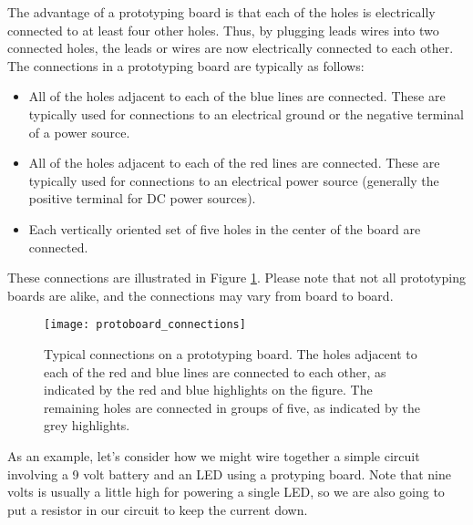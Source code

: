 The advantage of a prototyping board is that each of the holes is electrically 
connected to at least four other holes. Thus, by plugging leads wires 
into two connected holes, the leads or wires are now electrically 
connected to each other. The connections in a prototyping board are typically
as follows:
\begin{itemize}
\item All of the holes adjacent to each of the blue lines are connected. 
These are typically used for connections to an electrical ground or the
negative terminal of a power source.
\item All of the holes adjacent to each of the red lines are connected.
These are typically used for connections to an electrical power source 
(generally the positive terminal for DC power sources).
\item Each vertically oriented set of five holes in the center of the board
are connected.
\end{itemize}
These connections are illustrated in Figure \ref{fig:protoboard_connections}.
Please note that not all prototyping boards are alike, and the connections
may vary from board to board.
\begin{figure}[htbp!]
\centering
\texttt{[image: protoboard\_connections]}
\caption[Typical connections on a prototyping board]{Typical connections on a
prototyping board. The holes adjacent to each of the red and blue lines are
connected to each other, as indicated by the red and blue highlights on
the figure. The remaining holes are connected in groups of five, as indicated
by the grey highlights.}
\label{fig:protoboard_connections}
\end{figure}

As an example, let's consider how we might wire together a simple circuit 
involving a 9 volt battery and an LED using a protyping board. Note that 
nine volts is usually a little high for powering a single LED, so we are also
going to put a resistor in our circuit to keep the current down.


